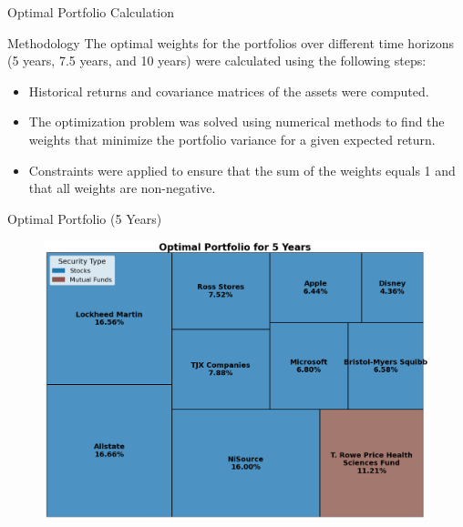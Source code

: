 \documentclass{beamer}
\begin{document}
\begin{frame}{Optimal Portfolio Calculation}
    \begin{block}{Methodology}
        The optimal weights for the portfolios over different time horizons (5 years, 7.5 years, and 10 years) were calculated using the following steps:
        \begin{itemize}
            \item Historical returns and covariance matrices of the assets were computed.
            \item The optimization problem was solved using numerical methods to find the weights that minimize the portfolio variance for a given expected return.
            \item Constraints were applied to ensure that the sum of the weights equals 1 and that all weights are non-negative.
        \end{itemize}
    \end{block}
\end{frame}

\begin{frame}{Optimal Portfolio (5 Years)}
    \begin{figure}
        \centering
        \includegraphics[height=0.8\textheight]{../Figures/optimal_portfolio_5_years.png}
    \end{figure}
\end{frame}
\end{document}
